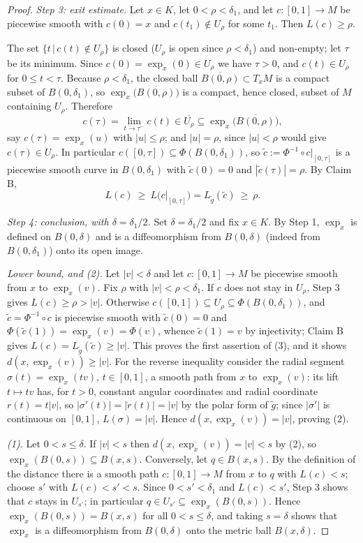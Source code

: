 \begin{proof}
\emph{Step 3: exit estimate.} Let $x\in K$, let $0<\rho<\delta_1$,
and let $c\colon[0,1]\to M$ be piecewise smooth with $c(0)=x$ and
$c(t_1)\notin U_\rho$ for some $t_1$. Then $L(c)\ge\rho$.

The set $\{t\,|\,c(t)\notin U_\rho\}$ is closed ($U_\rho$ is open
since $\rho<\delta_1$) and non-empty; let $\tau$ be its minimum.
Since $c(0)=\exp_x(0)\in U_\rho$ we have $\tau>0$, and $c(t)\in
U_\rho$ for $0\le t<\tau$. Because $\rho<\delta_1$, the closed
ball $\overline{B(0,\rho)}\subset T_xM$ is a compact subset of
$B(0,\delta_1)$, so $\exp_x\big(\overline{B(0,\rho)}\big)$ is a
compact, hence closed, subset of $M$ containing $U_\rho$.
Therefore
$$c(\tau)=\lim_{t\to\tau^-}c(t)\in\overline{U_\rho}\subseteq
\exp_x\big(\overline{B(0,\rho)}\big),$$
say $c(\tau)=\exp_x(u)$ with $|u|\le\rho$; and $|u|=\rho$, since
$|u|<\rho$ would give $c(\tau)\in U_\rho$. In particular
$c([0,\tau])\subseteq\Phi(B(0,\delta_1))$, so
$\tilde c:=\Phi^{-1}\circ c|_{[0,\tau]}$ is a piecewise smooth
curve in $B(0,\delta_1)$ with $\tilde c(0)=0$ and
$|\tilde c(\tau)|=\rho$. By Claim B,
$$L(c)\ \ge\ L\big(c|_{[0,\tau]}\big)
=L_{\tilde g}(\tilde c)\ \ge\ \rho.$$

\emph{Step 4: conclusion, with $\delta=\delta_1/2$.} Set
$\delta=\delta_1/2$ and fix $x\in K$. By Step 1, $\exp_x$ is
defined on $B(0,\delta)$ and is a diffeomorphism from $B(0,\delta)$
(indeed from $B(0,\delta_1)$) onto its open image.

\emph{Lower bound, and (2).} Let $|v|<\delta$ and let
$c\colon[0,1]\to M$ be piecewise smooth from $x$ to $\exp_x(v)$.
Fix $\rho$ with $|v|<\rho<\delta_1$. If $c$ does not stay in
$U_\rho$, Step 3 gives $L(c)\ge\rho>|v|$. Otherwise
$c([0,1])\subseteq U_\rho\subseteq\Phi(B(0,\delta_1))$, and
$\tilde c=\Phi^{-1}\circ c$ is piecewise smooth with
$\tilde c(0)=0$ and $\Phi(\tilde c(1))=\exp_x(v)=\Phi(v)$, whence
$\tilde c(1)=v$ by injectivity; Claim B gives
$L(c)=L_{\tilde g}(\tilde c)\ge|v|$. This proves the first
assertion of (3), and it shows $d(x,\exp_x(v))\ge|v|$. For the
reverse inequality consider the radial segment
$\sigma(t)=\exp_x(tv)$, $t\in[0,1]$, a smooth path from $x$ to
$\exp_x(v)$: its lift $t\mapsto tv$ has, for $t>0$, constant
angular coordinates and radial coordinate $r(t)=t|v|$, so
$|\sigma'(t)|=|\dot r(t)|=|v|$ by the polar form of $\tilde g$;
since $|\sigma'|$ is continuous on $[0,1]$, $L(\sigma)=|v|$.
Hence $d(x,\exp_x(v))=|v|$, proving (2).

\emph{(1).} Let $0<s\le\delta$. If $|v|<s$ then
$d(x,\exp_x(v))=|v|<s$ by (2), so
$\exp_x(B(0,s))\subseteq B(x,s)$. Conversely, let $q\in B(x,s)$.
By the definition of the distance there is a smooth path
$c\colon[0,1]\to M$ from $x$ to $q$ with $L(c)<s$; choose $s'$
with $L(c)<s'<s$. Since $0<s'<\delta_1$ and $L(c)<s'$, Step 3
shows that $c$ stays in $U_{s'}$; in particular
$q\in U_{s'}\subseteq\exp_x(B(0,s))$. Hence
$\exp_x(B(0,s))=B(x,s)$ for all $0<s\le\delta$, and taking
$s=\delta$ shows that $\exp_x$ is a diffeomorphism from
$B(0,\delta)$ onto the metric ball $B(x,\delta)$.


\end{proof}

